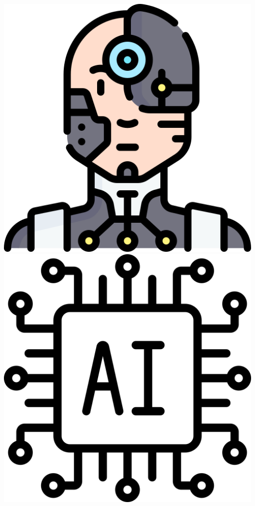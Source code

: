 \begin{tcolorbox}
\begin{spacing}{1.2}
\begin{multicols}{2}
\begin{center}
                \hfill
                \includegraphics[scale=0.055]{figs/cyborg.png}
                \hfill
                \includegraphics[scale=0.055]{figs/microchip.png}

\end{center}
\end{multicols}
\end{spacing}
\end{tcolorbox}
